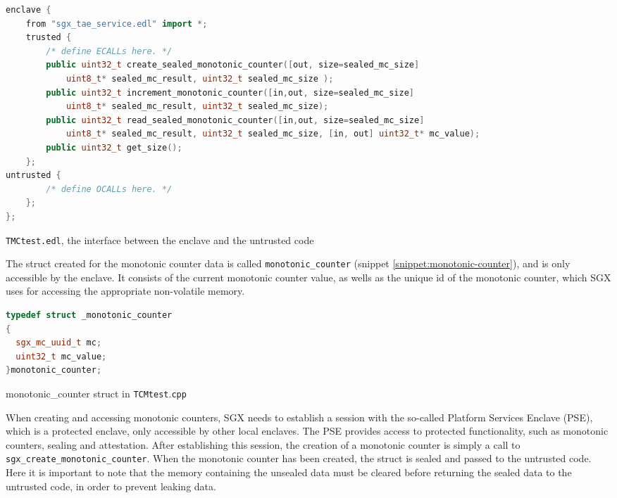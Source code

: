 \documentclass[12pt]{article}
\begin{document}
	\vspace{-1cm}
	\begin{snippet}[!ht]
	\begin{lstlisting}[language=C++, numbers=none]
enclave {
	from "sgx_tae_service.edl" import *;
    trusted {
        /* define ECALLs here. */
        public uint32_t create_sealed_monotonic_counter([out, size=sealed_mc_size]
            uint8_t* sealed_mc_result, uint32_t sealed_mc_size );
		public uint32_t increment_monotonic_counter([in,out, size=sealed_mc_size]
            uint8_t* sealed_mc_result, uint32_t sealed_mc_size);
		public uint32_t read_sealed_monotonic_counter([in,out, size=sealed_mc_size]
            uint8_t* sealed_mc_result, uint32_t sealed_mc_size, [in, out] uint32_t* mc_value);
		public uint32_t get_size();
    };
untrusted {
        /* define OCALLs here. */
    };
};
	\end{lstlisting}
	\caption{\texttt{TMCtest.edl}, the interface between the enclave and the untrusted code\label{snippet:tmctest.edl}}
	\end{snippet}

	The struct created for the monotonic counter data is called \texttt{monotonic\_counter} (snippet \ref{snippet:monotonic-counter}), and is only accessible by the enclave. It consists of the current monotonic counter value, as wells as the unique id of the monotonic counter, which SGX uses for accessing the appropriate non-volatile memory.

	\vspace{-1cm}
	\begin{snippet}[!ht]
		\begin{lstlisting}[language=C++, numbers=none]
typedef struct _monotonic_counter
{
  sgx_mc_uuid_t mc;
  uint32_t mc_value;
}monotonic_counter;
		\end{lstlisting}
		\caption{monotonic\_counter struct in \texttt{TCMtest$.$cpp} \label{snippet:monotonic-counter}}
	\end{snippet}

	When creating and accessing monotonic counters, SGX needs to establish a session with the so-called Platform Services Enclave (PSE), which is a protected enclave, only accessible by other local enclaves. 
	The PSE provides access to protected functionality, such as monotonic counters, sealing and attestation.
	After establishing this session, the creation of a monotonic counter is simply a call to \texttt{sgx\_create\_monotonic\_counter}.
	When the monotonic counter has been created, the struct is sealed and passed to the untrusted code. 
	Here it is important to note that the memory containing the unsealed data must be cleared before returning the sealed data to the untrusted code, in order to prevent leaking data.
\end{document}

